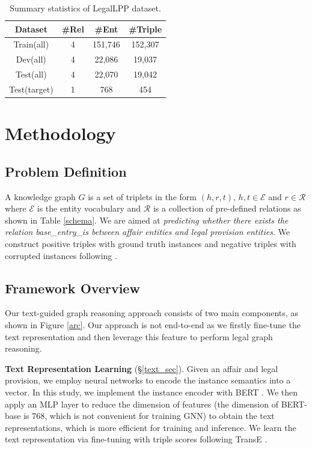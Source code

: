 \documentclass[runningheads]{llncs}
\begin{document}
 \begin{table}[!htbp]
    \centering
         \caption{Summary statistics of LegalLPP dataset.}
    \begin{tabular}{c|ccc}
    \toprule
    \textbf{Dataset} & \textbf{\#Rel} & \textbf{\#Ent} & \textbf{\#Triple}  \\
    \midrule
     Train(all) & 4& 151,746  & 152,307  \\
     Dev(all) & 4& 22,086 & 19,037   \\
     Test(all) & 4& 22,070 & 19,042   \\
     Test(target) & 1& 768 &  454 \\
    \bottomrule
    \end{tabular}

    \label{tab:dataset}
\end{table}

\section{Methodology}
\subsection{Problem Definition}
A knowledge graph $G$ is a set of triplets in the form $(h, r, t)$, $h, t \in \mathcal{E}$ and $r \in \mathcal{R}$ where $\mathcal{E}$ is the entity vocabulary and $\mathcal{R}$ is a collection of pre-defined relations as shown in Table \ref{schema}. We are aimed at \emph{predicting whether there exists the relation base\_entry\_is between affair entities and legal provision entities}. We construct positive triples with ground truth instances and negative triples with corrupted instances following \cite{TransE:conf/nips/BordesUGWY13}.

\subsection{Framework Overview}
Our text-guided graph reasoning approach consists of two main components, as shown in  Figure \ref{arc}. Our approach is not end-to-end as we firstly fine-tune the text representation and then leverage this feature to perform legal graph reasoning.
 
\textbf{Text Representation Learning} (\S \ref{text_sec}).  Given an affair and legal provision, we employ neural networks to encode the instance semantics into a vector. In this study, we implement the instance encoder with BERT \cite{devlin2018bert}. We then apply an MLP layer to reduce the dimension of features (the dimension of BERT-base is 768, which is not convenient for training GNN) to obtain the text representations, which is more efficient for training and inference.  We learn the text representation via fine-tuning with triple scores following TransE \cite{TransE:conf/nips/BordesUGWY13}.
\end{document}
